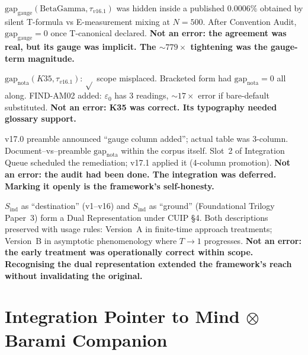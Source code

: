 \documentclass[12pt, a4paper]{article}
\begin{document}
\begin{formalbox}[title={FIND-SA03: BetaGamma gauge (E3)}]
$\mathrm{gap}_{\mathrm{gauge}}(\mathrm{BetaGamma}, \tau_{v16.1})$ was
hidden inside a published $0.0006\%$ obtained by silent T-formula vs
E-measurement mixing at $N=500$. After Convention Audit,
$\mathrm{gap}_{\mathrm{gauge}} = 0$ once T-canonical declared.
\textbf{Not an error: the agreement was real, but its gauge was implicit.
The $\sim 779\times$ tightening was the gauge-term magnitude.}
\end{formalbox}

\begin{formalbox}[title={FIND-SA04: K35 typography (E4)}]
$\mathrm{gap}_{\mathrm{nota}}(K35, \tau_{v16.1})$: $\sqrt{}$ scope
misplaced. Bracketed form had $\mathrm{gap}_{\mathrm{nota}} = 0$ all
along. FIND-AM02 added: $\varepsilon_0$ has 3 readings,
$\sim 17\times$ error if bare-default substituted.
\textbf{Not an error: K35 was correct. Its typography needed glossary
support.}
\end{formalbox}

\begin{formalbox}[title={FIND-SA05: Master Status Table (E5)}]
v17.0 preamble announced ``gauge column added''; actual table was
3-column. Document--vs--preamble $\mathrm{gap}_{\mathrm{nota}}$
within the corpus itself. Slot~2 of Integration Queue scheduled the
remediation; v17.1 applied it (4-column promotion).
\textbf{Not an error: the audit had been done. The integration was
deferred. Marking it openly is the framework's self-honesty.}
\end{formalbox}

\begin{formalbox}[title={FIND-SA06: The Inversion (E6)}]
$S_{\mathrm{ind}}$ as ``destination'' (v1--v16) and $S_{\mathrm{ind}}$
as ``ground'' (Foundational Trilogy Paper~3) form a Dual
Representation under CUIP §4. Both descriptions preserved with usage
rules: Version~A in finite-time approach treatments; Version~B in
asymptotic phenomenology where $T \to 1$ progresses.
\textbf{Not an error: the early treatment was operationally correct
within scope. Recognising the dual representation extended the
framework's reach without invalidating the original.}
\end{formalbox}

\section{Integration Pointer to Mind $\otimes$ Barami Companion}
\end{document}
